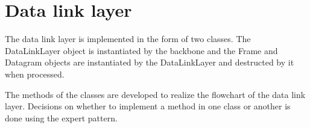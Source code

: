 \section{Data link layer}
The data link layer is implemented in the form of two classes. The DataLinkLayer
object is instantiated by the backbone and the Frame and Datagram objects are
instantiated by the DataLinkLayer and destructed by it when processed.


The methods of the classes are developed to realize the flowchart of the data
link layer. Decisions on whether to implement a method in one class or another
is done using the expert pattern.

